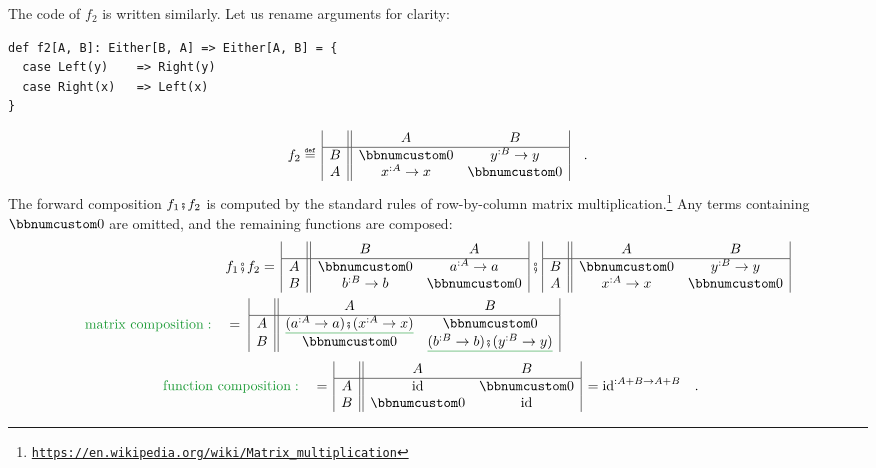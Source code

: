 The code of $f_{2}$ is written similarly. Let us rename arguments
for clarity:
\begin{lstlisting}
def f2[A, B]: Either[B, A] => Either[A, B] = {
  case Left(y)    => Right(y)
  case Right(x)   => Left(x)
}
\end{lstlisting}
\[
f_{2}\triangleq\,\begin{array}{|c||cc|}
 & A & B\\
\hline B & \bbnum 0 & y^{:B}\rightarrow y\\
A & x^{:A}\rightarrow x & \bbnum 0
\end{array}\quad.
\]
The forward composition $f_{1}\bef f_{2}$ is computed by the standard
rules of row-by-column matrix multiplication.\footnote{\texttt{\href{https://en.wikipedia.org/wiki/Matrix_multiplication}{https://en.wikipedia.org/wiki/Matrix\_multiplication}}}
Any terms containing $\bbnum 0$ are omitted, and the remaining functions
are composed:
\begin{align*}
 & f_{1}\bef f_{2}=\,\begin{array}{|c||cc|}
 & B & A\\
\hline A & \bbnum 0 & a^{:A}\rightarrow a\\
B & b^{:B}\rightarrow b & \bbnum 0
\end{array}\,\bef\,\begin{array}{|c||cc|}
 & A & B\\
\hline B & \bbnum 0 & y^{:B}\rightarrow y\\
A & x^{:A}\rightarrow x & \bbnum 0
\end{array}\\
{\color{greenunder}\text{matrix composition}:}\quad & =\,\,\begin{array}{|c||cc|}
 & A & B\\
\hline A & \gunderline{(a^{:A}\rightarrow a)\bef(x^{:A}\rightarrow x)} & \bbnum 0\\
B & \bbnum 0 & \gunderline{(b^{:B}\rightarrow b)\bef(y^{:B}\rightarrow y)}
\end{array}
\end{align*}
\begin{align*}
{\color{greenunder}\text{function composition}:}\quad & =\,\begin{array}{|c||cc|}
 & A & B\\
\hline A & \text{id} & \bbnum 0\\
B & \bbnum 0 & \text{id}
\end{array}\,=\text{id}^{:A+B\rightarrow A+B}\quad.
\end{align*}

